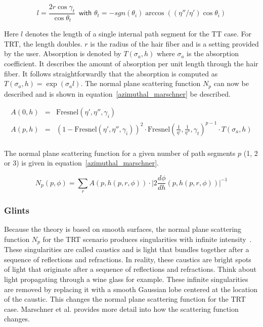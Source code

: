 \documentclass[11pt,a4paper]{report}
\begin{document}
\begin{equation}
l = \frac{2r \cos \gamma_t}{\cos \theta_t}\,\,\, \textsf{with $\theta_t = -sgn(\theta_i) \arccos ((\eta'' / \eta') \cos \theta_i)$}
\end{equation}

Here $l$ denotes the length of a single internal path segment for the TT case. For TRT, the length doubles. $r$ is the radius of the hair fiber and is a setting provided by the user. Absorption is denoted by $T(\sigma_a, h)$ where $\sigma_a$ is the absorption coefficient. It describes the amount of absorption per unit length through the hair fiber. It follows straightforwardly that the absorption is computed as $T(\sigma_a, h) = \exp( \sigma_a l )$. The normal plane scattering function $N_p$ can now be described and is shown in equation~\ref{azimuthal_marschner} be described.

\begin{eqnarray*}
A(0, h) & = & \textrm{Fresnel}( \eta', \eta'', \gamma_i ) \\
A(p, h) & = & (1 - \textrm{Fresnel}( \eta', \eta'', \gamma_i ))^2 \cdot \textrm{Fresnel}( \frac{1}{\eta'}, \frac{1}{\eta''}, \gamma_t )^ {p-1} \cdot T(\sigma_a, h) \\
\label{azimuthal_marschner}
\end{eqnarray*}

The normal plane scattering function for a given number of path segments $p$ (1, 2 or 3) is given in equation~\ref{azimuthal_marschner}.

\begin{equation}
N_p(p, \phi) = \sum\limits_r A(p, h(p, r, \phi)) \cdot \Big \vert 2 \frac{d\phi}{dh}( p, h(p, r, \phi) ) \Big \vert^{-1}
\end{equation}

\subsubsection{Glints}

Because the theory is based on smooth surfaces, the normal plane scattering function $N_p$ for the TRT scenario produces singularities with infinite intensity~\cite{marschner}. These singularities are called caustics and is light that bundles together after a sequence of reflections and refractions. In reality, these caustics are bright spots of light that originate after a sequence of reflections and refractions. Think about light propagating through a wine glass for example. These infinite singularities are removed by replacing it with a smooth Gaussian lobe centered at the location of the caustic. This changes the normal plane scattering function for the TRT case. Marschner et al.\cite{marschner} provides more detail into how the scattering function changes.
\end{document}

